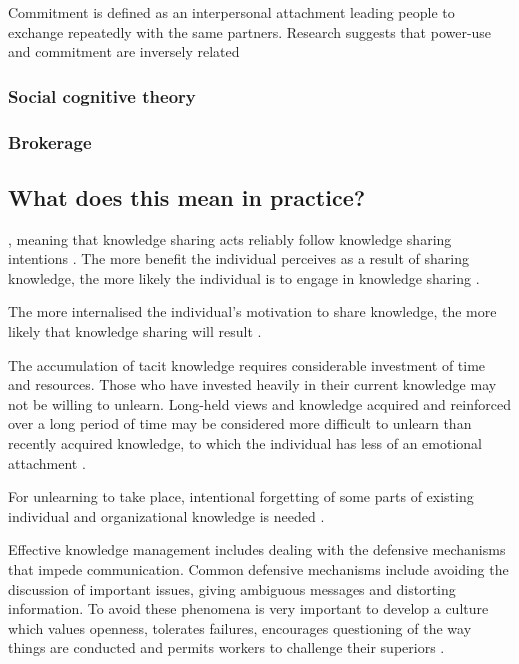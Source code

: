 Commitment is defined as an interpersonal attachment leading people to exchange repeatedly with the same partners. Research suggests that power-use and commitment are inversely related \citep{cook1978power}


\subsubsection{Social cognitive theory}

\subsubsection{Brokerage}



\subsection{What does this mean in practice?}

, meaning that knowledge sharing acts reliably follow knowledge sharing intentions \citep{witherspoon2013antecedents}. The more benefit the individual perceives as a result of sharing knowledge, the more likely the individual is to engage in knowledge sharing \citep{bock2001breaking,witherspoon2013antecedents}.

The more internalised the individual’s motivation to share knowledge, the more likely that knowledge sharing will result \citep{gagne2009model,witherspoon2013antecedents}.

The accumulation of tacit knowledge requires considerable investment of time and resources. Those who have invested heavily in their current knowledge may not be willing to unlearn. Long-held views and knowledge acquired and reinforced over a long period of time may be considered more difficult to unlearn than recently acquired knowledge, to which the individual has less of an emotional attachment \citep{rebernik2007fostering}.

For unlearning to take place, intentional forgetting of some parts of existing individual and organizational knowledge is needed \citep{rebernik2007fostering}.

Effective knowledge management includes dealing with the defensive mechanisms that impede communication. Common defensive mechanisms include avoiding the discussion of important issues, giving ambiguous messages and distorting information. To avoid these phenomena is very important to develop a culture which values openness, tolerates failures, encourages questioning of the way things are conducted and permits workers to challenge their superiors \citep{lubit2001keys}.

